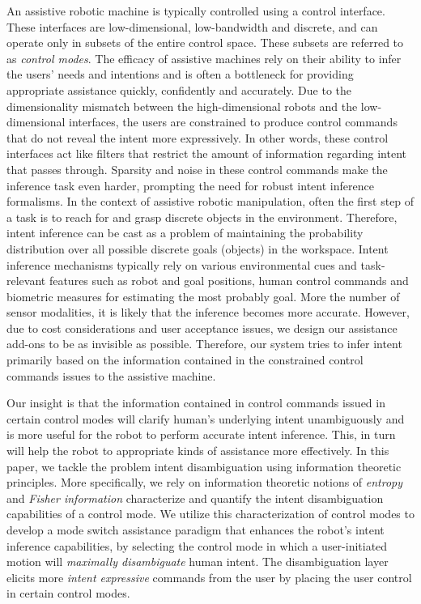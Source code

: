 \documentclass[conference]{IEEEtran}
\begin{document}
An assistive robotic machine is typically controlled using a control interface. These interfaces are low-dimensional, low-bandwidth and discrete, and can operate only in subsets of the entire control space. These subsets are referred to as \textit{control modes}. The efficacy of assistive machines rely on their ability to infer the users' needs and intentions and is often a bottleneck for providing appropriate assistance quickly, confidently and accurately. Due to the dimensionality mismatch between the high-dimensional robots and the low-dimensional interfaces, the users are constrained to produce control commands that do not reveal the intent more expressively. In other words, these control interfaces act like filters that restrict the amount of information regarding intent that passes through. Sparsity and noise in these control commands make the inference task even harder, prompting the need for robust intent inference formalisms. In the context of assistive robotic manipulation, often the first step of a task is to reach for and grasp discrete objects in the environment. Therefore, intent inference can be cast as a problem of maintaining the probability distribution over all possible discrete goals (objects) in the workspace. Intent inference mechanisms typically rely on various environmental cues and task-relevant features such as robot and goal positions, human control commands and biometric measures for estimating the most probably goal. More the number of sensor modalities, it is likely that the inference becomes more accurate. However, due to cost considerations and user acceptance issues, we design our assistance add-ons to be as invisible as possible. Therefore, our system tries to infer intent primarily based on the information contained in the constrained control commands issues to the assistive machine.

Our insight is that the information contained in control commands issued in certain control modes will clarify human's underlying intent unambiguously and is more useful for the robot to perform accurate intent inference. This, in turn will help the robot to appropriate kinds of assistance more effectively. In this paper, we tackle the problem intent disambiguation using information theoretic principles. More specifically, we rely on information theoretic notions of \textit{entropy} and \textit{Fisher information} characterize and quantify the intent disambiguation capabilities of a control mode. We utilize this characterization of control modes to develop a mode switch assistance paradigm that enhances the robot's intent inference capabilities, by selecting the control mode in which a user-initiated motion will \textit{maximally disambiguate} human intent. The disambiguation layer elicits more \textit{intent expressive} commands from the user by placing the user control in certain control modes.
\end{document}
